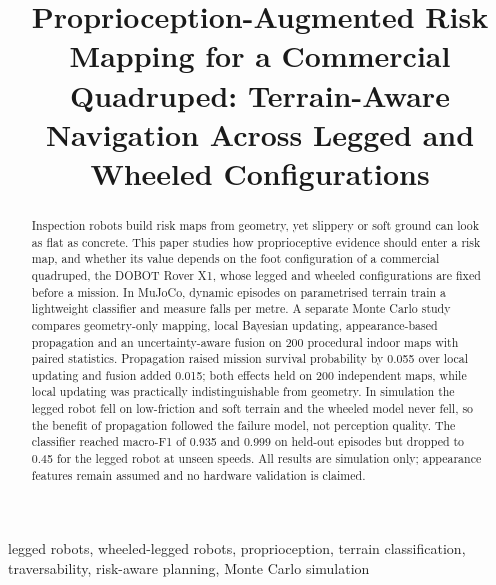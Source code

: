 \documentclass[conference,a4paper]{IEEEtran}
\begin{document}
\title{Proprioception-Augmented Risk Mapping for a Commercial Quadruped: Terrain-Aware Navigation Across Legged and Wheeled Configurations}

\author{
}

\maketitle

\begin{abstract}
Inspection robots build risk maps from geometry, yet slippery or soft ground can look as flat as concrete. This paper studies how proprioceptive evidence should enter a risk map, and whether its value depends on the foot configuration of a commercial quadruped, the DOBOT Rover X1, whose legged and wheeled configurations are fixed before a mission. In MuJoCo, \vnEpisodesTotal{} dynamic episodes on parametrised terrain train a lightweight classifier and measure falls per metre. A separate Monte Carlo study compares geometry-only mapping, local Bayesian updating, appearance-based propagation and an uncertainty-aware fusion on 200 procedural indoor maps with paired statistics. Propagation raised mission survival probability by 0.055 over local updating and fusion added 0.015; both effects held on 200 independent maps, while local updating was practically indistinguishable from geometry. In simulation the legged robot fell on low-friction and soft terrain and the wheeled model never fell, so the benefit of propagation followed the failure model, not perception quality. The classifier reached macro-F1 of 0.935 and 0.999 on held-out episodes but dropped to 0.45 for the legged robot at unseen speeds. All results are simulation only; appearance features remain assumed and no hardware validation is claimed.
\end{abstract}

\begin{IEEEkeywords}
legged robots, wheeled-legged robots, proprioception, terrain classification, traversability, risk-aware planning, Monte Carlo simulation
\end{IEEEkeywords}
\end{document}
